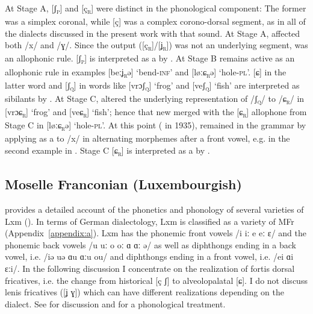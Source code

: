 \begin{xlist}
At Stage A, [ʃ\textsc{\textsubscript{p}}] and [ç\textsc{\textsubscript{r}}] were distinct in the phonological component: The former was a simplex coronal, while [ç] was a complex corono-dorsal segment, as in all of the dialects discussed in the present work with that sound. At Stage A,  affected both /x/ and /ɣ/. Since the output ([ç\textsc{\textsubscript{r}}]/[ʝ\textsc{\textsubscript{r}}]) was not an underlying segment,  was an allophonic rule. [ʃ\textsc{\textsubscript{p}}] is interpreted as a  by . At Stage B  remains active as an allophonic rule in examples [beːʝ\textsc{\textsubscript{r}}ǝ] ‘bend-\textsc{inf}’ and [løːɕ\textsc{\textsubscript{r}}ǝ] ‘hole-\textsc{pl}’. [ɕ] in the latter word and [ʃ\textsc{\textsubscript{q}}] in words like [vrɔʃ\textsc{\textsubscript{q}}] ‘frog’ and [veʃ\textsc{\textsubscript{q}}] ‘fish’ are interpreted as sibilants by . At Stage C,  altered the underlying representation of /ʃ\textsc{\textsubscript{q}}/ to /ɕ\textsc{\textsubscript{r}}/ in [vrɔɕ\textsc{\textsubscript{r}}] ‘frog’ and [veɕ\textsc{\textsubscript{r}}] ‘fish’; hence that new  merged with the [ɕ\textsc{\textsubscript{r}}] allophone from Stage C in [løːɕ\textsc{\textsubscript{r}}ǝ] ‘hole-\textsc{pl}’. At this point ( in 1935),  remained in the grammar by applying as a  to /x/ in alternating morphemes after a front vowel, e.g. in the second example in . Stage C [ɕ\textsc{\textsubscript{r}}] is interpreted as a  by .

\subsection{Moselle Franconian (Luxembourgish)}\label{sec:10.3.2}

\citet{Gilles1999} provides a detailed account of the phonetics and phonology of several varieties of Lxm (). In terms of German dialectology, Lxm is classified as a variety of MFr (Appendix~\ref{appendix:a}). Lxm has the phonemic front vowels /i iː e eː ɛ/ and the phonemic back vowels /u uː o oː ɑ ɑː ǝ/ as well as diphthongs ending in a back vowel, i.e. /iǝ uǝ ɑu ɑːu ou/ and diphthongs ending in a front vowel, i.e. /ei ɑi ɛːi/. In the following discussion I concentrate on the realization of fortis dorsal fricatives, i.e. the change from historical [ç ʃ] to alveolopalatal [ɕ]. I do not discuss lenis fricatives ([ʝ ɣ]) which can have different realizations depending on the dialect. See \citet{Gilles1999} for discussion and \citet{Hall2014b} for a phonological treatment.\largerpage


\end{xlist}
